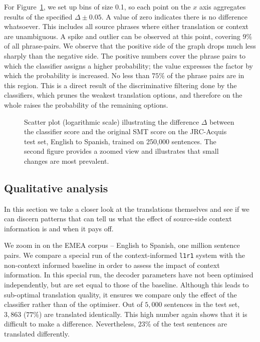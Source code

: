 For Figure~\ref{fig:scoredifference}, we set up bins of size 0.1, so each point
on the $x$ axis aggregates results of the specified $\Delta \pm 0.05$. A
value of zero indicates there is no difference whatsoever. This includes all
source phrases where either translation or context are unambiguous. A spike and
outlier can be observed at this point, covering $9\%$ of
all phrase-pairs. We observe that the positive side of the graph drops much
less sharply than the negative side. The positive numbers cover the phrase
pairs to which the classifier assigns a higher probability; the value expresses
the factor by which the probability is increased. No less than $75\%$ of the
phrase pairs are in this region. This is a direct result of the discriminative
filtering done by the classifiers, which prunes the weakest translation
options, and therefore on the whole raises the probability of the remaining
options.

\begin{figure}
\begin{center}
\setlength\figureheight{5cm}
\setlength\figurewidth{5cm}
 
\caption{Scatter plot (logarithmic scale) illustrating the difference $\Delta$
between the classifier score and the original SMT score on the JRC-Acquis
 test set, English to Spanish, trained on 250,000 sentences. The second figure provides a zoomed view and illustrates that small changes are most prevalent.}
\label{fig:scoredifference}
\end{center}
\end{figure}


\subsection{Qualitative analysis}
\label{sec:qualanal}

In this section we take a closer look at the translations themselves and see if
we can discern patterns that can tell us what the effect of source-side context
information is and when it pays off.

We zoom in on the EMEA corpus -- English to Spanish, one million sentence
pairs. We compare a special run of the context-informed \texttt{l1r1} system
with the non-context informed baseline in order to assess the impact of context
information. In this special run, the decoder parameters have not been
optimised independently, but are set equal to those of the baseline. Although
this leads to sub-optimal translation quality, it ensures we compare only the
effect of the classifier rather than of the optimiser. Out of $5,000$ sentences
in the test set, $3,863$ ($77\%$) are translated identically. This high number
again shows that it is difficult to make a difference. Nevertheless, $23\%$
of the test sentences are translated differently.

